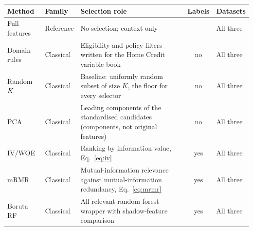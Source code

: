 \documentclass[final,5p,twocolumn]{elsarticle}
\newcommand{\Kfeat}{K}
\providecommand{\DIFaddbeginFL}{} %
\providecommand{\DIFdelendFL}{} %
\begin{document}
\begin{table}[htbp]
\begin{threeparttable}
\DIFdelendFL \DIFaddbeginFL \begin{tabular}{@{}llL{46mm}cl@{}}
\toprule
Method & Family & Selection role & Labels & Datasets \\
\midrule
Full features & Reference & No selection; context only & -- & All three \\
Domain rules & Classical & Eligibility and policy filters written for the Home Credit variable book & no & All three \\
Random $\Kfeat$ & Classical & Baseline: uniformly random subset of size $\Kfeat$, the floor for every selector & no & All three \\
PCA & Classical & Leading components of the standardised candidates (components, not original features) & no & All three \\
IV/WOE & Classical & Ranking by information value, Eq.~\eqref{eq:iv} & yes & All three \\
mRMR & Classical & Mutual-information relevance against mutual-information redundancy, Eq.~\eqref{eq:mrmr} & yes & All three \\
Boruta RF & Classical & All-relevant random-forest wrapper with shadow-feature comparison & yes & All three \\

\end{tabular}
\end{threeparttable}
\end{table}
\end{document}
